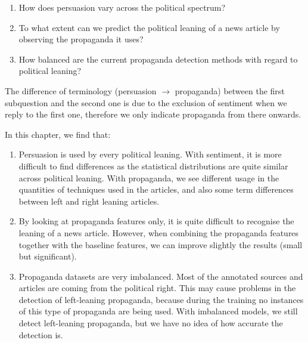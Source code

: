 \begin{enumerate}[label={\textbf{RQ3.\arabic*:}},leftmargin=2cm]
    \item How does persuasion vary across the political spectrum?
    \item To what extent can we predict the political leaning of a news article by observing the propaganda it uses?
    \item How balanced are the current propaganda detection methods with regard to political leaning?
\end{enumerate}

The difference of terminology (persuasion $\rightarrow$ propaganda) between the first subquestion and the second one is due to the exclusion of sentiment when we reply to the first one, therefore we only indicate propaganda from there onwards.

In this chapter, we find that:
\begin{enumerate}
    \item Persuasion is used by every political leaning. With sentiment, it is more difficult to find differences as the statistical distributions are quite similar across political leaning. With propaganda, we see different usage in the quantities of techniques used in the articles, and also some term differences between left and right leaning articles.
    \item By looking at propaganda features only, it is quite difficult to recognise the leaning of a news article. However, when combining the propaganda features together with the baseline features, we can improve slightly the results (small but significant).
    \item Propaganda datasets are very imbalanced. Most of the annotated sources and articles are coming from the political right. This may cause problems in the detection of left-leaning propaganda, because during the training no instances of this type of propaganda are being used. With imbalanced models, we still detect left-leaning propaganda, but we have no idea of how accurate the detection is.
\end{enumerate}

